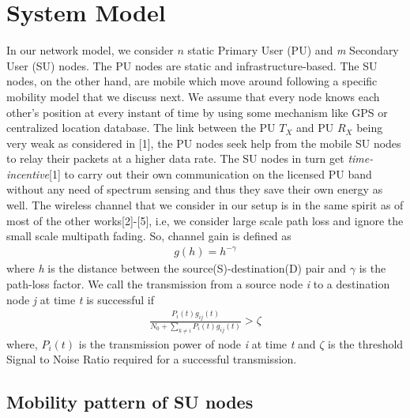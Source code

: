 \documentclass[conference]{IEEEtran}
\begin{document}
\section{System Model}

In our network model, we consider $n$ static Primary User (PU) and \emph{m} Secondary User (SU) nodes. The PU nodes are static and infrastructure-based.
The SU nodes, on the other hand, are mobile which move around following a specific mobility model that we discuss next. We assume that every node knows each other's position 
at every instant of time by using some mechanism like GPS or centralized location database. The link between the PU $T_X$ and PU $R_X$ 
being very weak as considered in [1], the PU nodes seek help from the mobile SU nodes to relay their packets at a higher data rate. The SU nodes in turn 
get \emph{time-incentive}[1] to carry out their own communication on the licensed PU band without any need of spectrum sensing and thus they save their own energy as well. 
The wireless channel that we consider in our setup is in the same spirit as of most of the other works[2]-[5], i.e, we consider large scale path loss and ignore the small scale 
multipath fading. So, channel gain is defined as 
\begin{gather*}
 g(h)=h^{-\gamma}
\end{gather*}where \emph{h} is the distance between the source(S)-destination(D) pair and $\gamma$ is the path-loss factor. We call the transmission from a source 
node \emph{i} to a destination node \emph{j} at time \emph{t} is successful if  
\begin{gather*}
\frac{P_i(t)g_{ij}(t)}{N_0 + \sum \limits_{k\neq i}P_i(t)g_{ij}(t)} > \zeta
\end{gather*}
where, $P_{i}(t)$ is the transmission power of node \emph{i} at time \emph{t} and $\zeta$ is the threshold Signal to Noise Ratio required for a successful transmission. 

\subsection{Mobility pattern of SU nodes}
\end{document}
